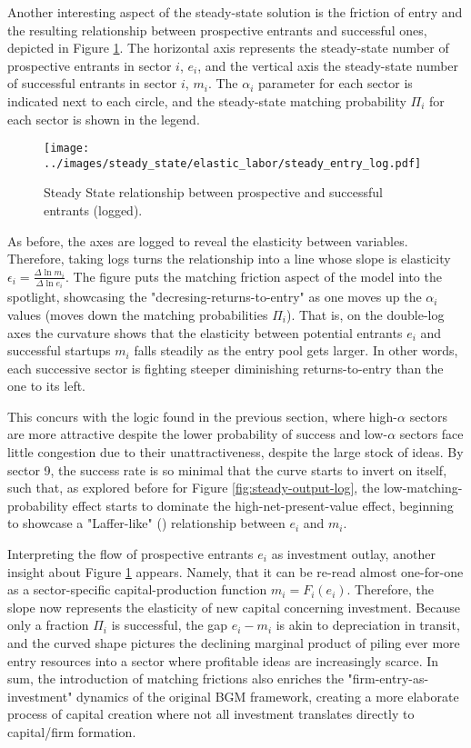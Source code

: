 \documentclass[a4paper,12pt]{article} %
\numberwithin{equation}{section} %
\numberwithin{figure}{section}
\numberwithin{table}{section}
\begin{document}
Another interesting aspect of the steady-state solution is the friction of entry and the resulting relationship 
between prospective entrants and successful ones, depicted in Figure \ref{fig:steady-entry-log}. 
The horizontal axis represents the steady-state number of prospective
entrants in sector $i$, $e_i$, and the vertical axis the steady-state number of successful entrants in sector $i$, $m_i$. The $\alpha_i$
parameter for each sector is indicated next to each circle, and the steady-state matching probability $\Pi_i$ for each sector is shown 
in the legend.

\begin{figure}[H]
  \centering
  \texttt{[image: ../images/steady\_state/elastic\_labor/steady\_entry\_log.pdf]}
  \caption{Steady State relationship between prospective and successful entrants (logged).}
  \label{fig:steady-entry-log}
\end{figure}
As before, the axes are logged to reveal the elasticity between variables.
Therefore, taking logs turns the relationship into a line whose slope is elasticity $\epsilon_i = \frac{\Delta \ln m_i}{\Delta \ln e_i}$. 
The figure puts the matching friction aspect of the model into the spotlight, showcasing the "decresing-returns-to-entry" 
as one moves up the $\alpha_i$ values (moves down the matching probabilities $\Pi_i$). That is, on the double-log axes the 
curvature shows that the elasticity between potential entrants $e_i$ and successful startups $m_i$ falls steadily as the entry pool 
gets larger. In other words, each successive sector is fighting steeper diminishing returns-to-entry than the one to its left. 

This concurs with the logic found in the previous section, where high-$\alpha$ sectors are more attractive despite the lower probability
of success and low-$\alpha$ sectors face little congestion due to their unattractiveness, despite the large stock of ideas.
By sector 9, the success rate is so minimal that the curve starts to invert on itself, such that, as explored before for 
Figure \ref{fig:steady-output-log}, the low-matching-probability effect starts to dominate the high-net-present-value effect, beginning
to showcase a "Laffer-like" (\cite{laffer1974balance}) relationship between $e_i$ and $m_i$.

Interpreting the flow of prospective entrants $e_i$ as investment outlay, another insight about Figure \ref{fig:steady-entry-log} appears.
Namely, that it can be re-read almost one-for-one as a sector-specific capital-production function $m_i = F_i(e_i)$.
Therefore, the slope now represents the elasticity of new capital concerning investment. Because only a fraction $\Pi_i$ is 
successful, the gap $e_i - m_i$ is akin to depreciation in transit, and the curved shape pictures the declining marginal 
product of piling ever more entry resources into a sector where profitable ideas are increasingly scarce. In sum, the introduction of
matching frictions also enriches the "firm-entry-as-investment" dynamics of the original BGM framework, creating a more elaborate
process of capital creation where not all investment translates directly to  capital/firm formation.
\end{document}
